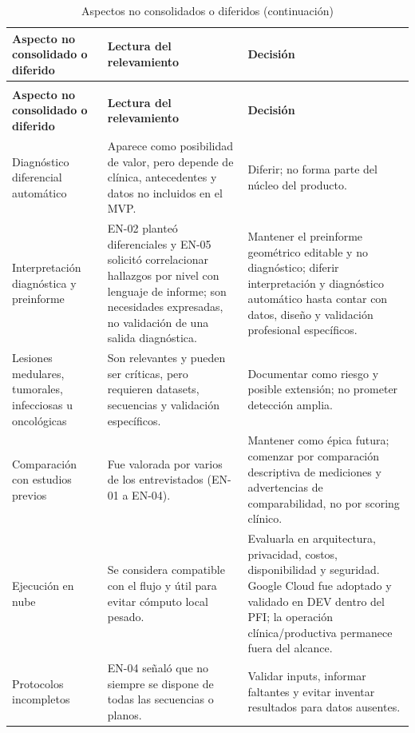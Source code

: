 {\small
\setlength{\LTleft}{0pt}
\setlength{\LTright}{0pt}
\renewcommand{\arraystretch}{1.18}
\setlength{\tabcolsep}{3pt}
\begin{longtable}{>{\raggedright\arraybackslash}p{} >{\raggedright\arraybackslash}p{} >{\raggedright\arraybackslash}p{}}
\caption{Aspectos no consolidados o diferidos}\label{tab:user-research-diferidos}\\
\hline
\textbf{Aspecto no consolidado o diferido} & \textbf{Lectura del relevamiento} & \textbf{Decisión} \\
\hline
\endfirsthead
\caption[]{Aspectos no consolidados o diferidos (continuación)}\\
\hline
\textbf{Aspecto no consolidado o diferido} & \textbf{Lectura del relevamiento} & \textbf{Decisión} \\
\hline
\endhead
\hline
\endfoot
Diagnóstico diferencial automático & Aparece como posibilidad de valor, pero depende de clínica, antecedentes y datos no incluidos en el MVP. & Diferir; no forma parte del núcleo del producto. \\
Interpretación diagnóstica y preinforme & EN-02 planteó diferenciales y EN-05 solicitó correlacionar hallazgos por nivel con lenguaje de informe; son necesidades expresadas, no validación de una salida diagnóstica. & Mantener el preinforme geométrico editable y no diagnóstico; diferir interpretación y diagnóstico automático hasta contar con datos, diseño y validación profesional específicos. \\
Lesiones medulares, tumorales, infecciosas u oncológicas & Son relevantes y pueden ser críticas, pero requieren datasets, secuencias y validación específicos. & Documentar como riesgo y posible extensión; no prometer detección amplia. \\
Comparación con estudios previos & Fue valorada por varios de los entrevistados (EN-01 a EN-04). & Mantener como épica futura; comenzar por comparación descriptiva de mediciones y advertencias de comparabilidad, no por scoring clínico. \\
Ejecución en nube & Se considera compatible con el flujo y útil para evitar cómputo local pesado. & Evaluarla en arquitectura, privacidad, costos, disponibilidad y seguridad. Google Cloud fue adoptado y validado en DEV dentro del PFI; la operación clínica/productiva permanece fuera del alcance. \\
Protocolos incompletos & EN-04 señaló que no siempre se dispone de todas las secuencias o planos. & Validar inputs, informar faltantes y evitar inventar resultados para datos ausentes. \\

\end{longtable}}
